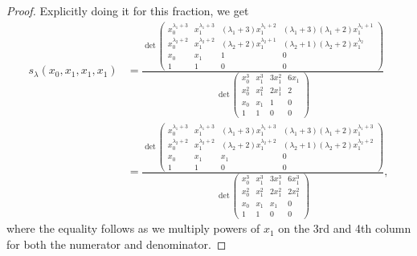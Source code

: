 \documentclass[11pt]{article}
\begin{document}
\begin{proof}
Explicitly doing it for this fraction, we get
\begin{align*}
    s_\lambda(x_0,x_1,x_1,x_1) &=\frac{\det\begin{pmatrix}
        x_0^{\lambda_1+3}&x_1^{\lambda_1+3}&(\lambda_1+3)x_1^{\lambda_1+2}&(\lambda_1+3)(\lambda_1+2)x_1^{\lambda_1+1}\\
        x_0^{\lambda_2+2}&x_1^{\lambda_2+2}&(\lambda_2+2)x_1^{\lambda_2+1}&(\lambda_2+1)(\lambda_2+2)x_1^{\lambda_2}\\
        x_0&x_1&1&0\\
        1&1&0&0
    \end{pmatrix}}{\det\begin{pmatrix}
        x_0^{3}&x_1^{3}&3x_1^{2}&6x_{1}\\
        x_0^{2}&x_1^{2}&2x_1^{1}&2\\
        x_0&x_1&1&0\\
        1&1&0&0
    \end{pmatrix}} \\
    &=\frac{\det\begin{pmatrix}
        x_0^{\lambda_1+3}&x_1^{\lambda_1+3}&(\lambda_1+3)x_1^{\lambda_1+3}&(\lambda_1+3)(\lambda_1+2)x_1^{\lambda_1+3}\\
        x_0^{\lambda_2+2}&x_1^{\lambda_2+2}&(\lambda_2+2)x_1^{\lambda_2+2}&(\lambda_2+1)(\lambda_2+2)x_1^{\lambda_2+2}\\
        x_0&x_1&x_1&0\\
        1&1&0&0
    \end{pmatrix}}{\det\begin{pmatrix}
        x_0^{3}&x_1^{3}&3x_1^{3}&6x_1^3\\
        x_0^{2}&x_1^{2}&2x_1^{2}&2x_1^2\\
        x_0&x_1&x_1&0\\
        1&1&0&0
    \end{pmatrix}},
\end{align*}
where the equality follows as we multiply powers of $x_1$ on the 3rd and 4th column for both the numerator and denominator.


\end{proof}
\end{document}
